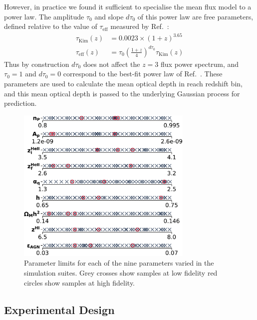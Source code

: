 \documentclass[a4paper,11pt]{article}
\begin{document}
However, in practice we found it sufficient to specialise the mean flux model to a power law. The amplitude $\tau_0$ and slope $d\tau_0$ of this power law are free parameters, defined relative to the value of $\tau_\mathrm{eff}$ measured by Ref.~\cite{Kim:2007}:
\begin{align}
\tau_\mathrm{Kim}(z) &= 0.0023 \times (1 + z)^{3.65} \\
 \tau_\mathrm{eff}(z) &= \tau_0 \left(\frac{1+z}{4}\right)^{d\tau_0}  \tau_\mathrm{Kim}(z)
 \label{eq:meanflux}
\end{align}
Thus by construction $d\tau_0$ does not affect the $z=3$ flux power spectrum, and $\tau_0 = 1$ and $d\tau_0 = 0$ correspond to the best-fit power law of Ref.~\cite{Kim:2007}. These parameters are used to calculate the mean optical depth in reach redshift bin, and this mean optical depth is passed to the underlying Gaussian process for prediction.

\begin{figure}
    \centering
    \includegraphics[width=0.75\textwidth]{figures/sample_params.pdf}
    \caption{\label{fig:samples}
    Parameter limits for each of the nine parameters varied in the simulation suites.
    Grey crosses show samples at low fidelity  red circles show samples at high fidelity.
    }
\end{figure}


\subsection{Experimental Design}
\label{sec:latinhypercube}
\end{document}

